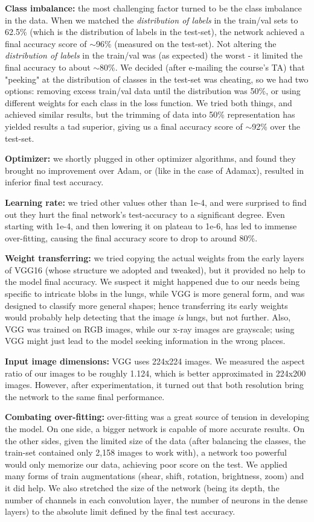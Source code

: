 \documentclass{article}
\begin{document}
\textbf{Class imbalance:} the most challenging factor turned to be the class imbalance in the data.
When we matched the \textit{distribution of labels} in the train/val sets to 62.5\% (which is the distribution of labels in the test-set), the network achieved a final accuracy score of $\sim$96\% (measured on the test-set). Not altering the \textit{distribution of labels} in the train/val was (as expected) the worst - it limited the final accuracy to about $\sim$80\%. We decided (after e-mailing the course's TA) that "peeking" at the distribution of classes in the test-set was cheating, so we had two options: removing excess train/val data until the distribution was 50\%, or using different weights for each class in the loss function.
We tried both things, and achieved similar results, but the trimming of data into 50\% representation has yielded results a tad superior, giving us a final accuracy score of $\sim$92\% over the test-set.

\textbf{Optimizer:} we shortly plugged in other optimizer algorithms, and found they brought no improvement over Adam, or (like in the case of Adamax), resulted in inferior final test accuracy.

\textbf{Learning rate:} we tried other values other than 1e-4, and were surprised to find out they hurt the final network's test-accuracy to a significant degree. Even starting with 1e-4, and then lowering it on plateau to 1e-6, has led to immense over-fitting, causing the final accuracy score to drop to around 80\%.

\textbf{Weight transferring:} we tried copying the actual weights from the early layers of VGG16 (whose structure we adopted and tweaked), but it provided no help to the model final accuracy. We suspect it might happened due to our needs being specific to intricate blobs in the lungs, while VGG is more general form, and was designed to classify more general shapes; hence transferring its early weights would probably help detecting that the image \textit{is} lungs, but not further. Also, VGG was trained on RGB images, while our x-ray images are grayscale; using VGG might just lead to the model seeking information in the wrong places.

\textbf{Input image dimensions:} VGG uses 224x224 images. We measured the aspect ratio of our images to be roughly 1.124, which is better approximated in 224x200 images. However, after experimentation, it turned out that both resolution bring the network to the same final performance.

\textbf{Combating over-fitting:} over-fitting was a great source of tension in developing the model.
On one side, a bigger network is capable of more accurate results. On the other sides, given the limited size of the data (after balancing the classes, the train-set contained only 2,158 images to work with), a network too powerful would only memorize our data, achieving poor score on the test.
We applied many forms of train augmentations (shear, shift, rotation, brightness, zoom) and it did help.
We also stretched the size of the network (being its depth, the number of channels in each convolution layer, the number of neurons in the dense layers) to the absolute limit defined by the final test accuracy.
\end{document}
